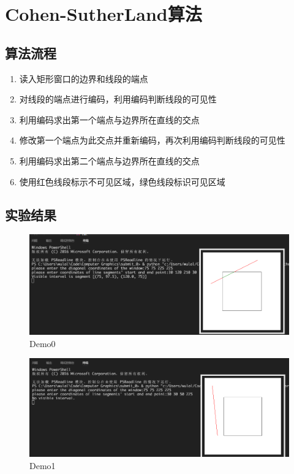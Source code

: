\documentclass[11pt,UTF8]{article}
\begin{document}
\section{Cohen-SutherLand算法}
\subsection{算法流程}
	\begin{enumerate}
		\item 读入矩形窗口的边界和线段的端点
		\item 对线段的端点进行编码，利用编码判断线段的可见性
		\item 利用编码求出第一个端点与边界所在直线的交点
		\item 修改第一个端点为此交点并重新编码，再次利用编码判断线段的可见性
		\item 利用编码求出第二个端点与边界所在直线的交点
		\item 使用红色线段标示不可见区域，绿色线段标识可见区域
	\end{enumerate}

\subsection{实验结果}
	\begin{figure}[H]
		\centering
		\includegraphics[width=\textwidth]{demo4.png}
		\caption{Demo0}\label{results}
	\end{figure}
	\begin{figure}[H]
		\centering
		\includegraphics[width=\textwidth]{demo5.png}
		\caption{Demo1}\label{results}
	\end{figure}
\newpage
\end{document}
